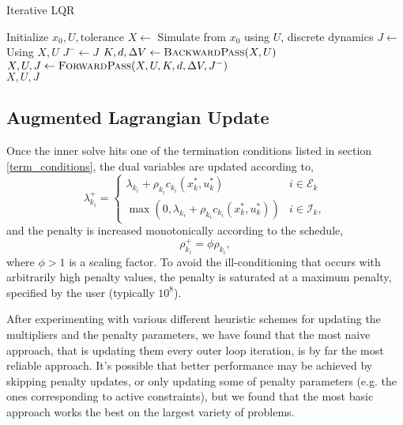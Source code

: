\documentclass[../root.tex]{subfiles}
\begin{document}
\begin{algorithm}
\begin{algorithmic}[1]
\caption{Iterative LQR} \label{alg:iLQR}
\State Initialize $x_0, U, \text{tolerance}$
\State $X \leftarrow$ Simulate from $x_0$ using $U$, discrete dynamics
    \State $J \leftarrow$ Using $X, U$
    \Do
        \State $J^{-} \leftarrow J$
        \State $K,d, \Delta V \leftarrow \textproc{BackwardPass}(X,U)$
        \State $X, U, J \leftarrow \textproc{ForwardPass}(X,U,K,d,\Delta V,J^{-})$
     \\
    \Return $X,U,J$
\EndFunction
\end{algorithmic}
\end{algorithm}

\subsection{Augmented Lagrangian Update}
    Once the inner solve hits one of the termination conditions listed in section
    \ref{term_conditions}, the dual variables are updated according to,
    \begin{equation} \label{eq:dual_update}
        \lambda_{k_i}^{+} = \begin{cases}
        \lambda_{k_i} + \rho_{k_i} c_{k_i}(x_k^*,u_k^*) & i \in \mathcal{E}_k \\
        \max (0,\lambda_{k_i} + \rho_{k_i} c_{k_i}(x_k^*,u_k^*)) & i \in \mathcal{I}_k,
        \end{cases}
    \end{equation} 
    and the penalty is increased monotonically according to the schedule,
    \begin{equation} \label{eq:penalty_update}
        \rho_{k_i}^+ = \phi \rho_{k_i},
    \end{equation}
    where $\phi > 1$ is a scaling factor. To avoid the ill-conditioning that 
    occurs with arbitrarily high penalty values, the penalty is saturated at a 
    maximum penalty, specified by the user (typically $10^8$).

    After experimenting with various different heuristic schemes for updating
    the multipliers and the penalty parameters, we have found that the most
    naive approach, that is updating them every outer loop iteration, is by
    far the most reliable approach. It's possible that better performance may
    be achieved by skipping penalty updates, or only updating some of penalty
    parameters (e.g. the ones corresponding to active constraints), but we
    found that the most basic approach works the best on the largest variety
    of problems.
\end{document}
